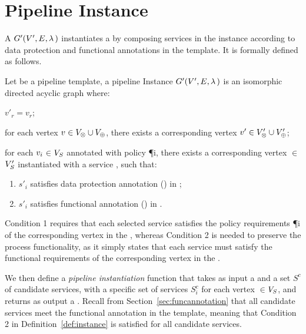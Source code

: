 \section{Pipeline Instance}\label{sec:instance}
A \pipelineInstance $G'(V',E,\lambda\,)$ instantiates a \pipelineTemplate \tChartFunction by composing services in the instance according to data protection and functional annotations in the template.  It is formally defined as follows.

    \begin{definition}\label{def:instance}
      Let \tChartFunction be a pipeline template, a pipeline Instance $G'(V',E,\lambda\,)$ is an isomorphic directed acyclic graph where:
      \begin{enumerate*}[label=\textit{\roman*})]
        \item $v'_r$$=$$v_r$;
        \item for each vertex $v_{}\in V_{\otimes}\cup V_{\oplus}$, there exists a corresponding vertex $v'_{}\in V'_{\otimes}\cup V'_{\oplus}$;
        \item for each $v_{i}$$\in$$V_S$ annotated with policy \P{i}, there exists a corresponding vertex $\in$$V'_S$ instantiated with a service , such that:
      \end{enumerate*}
      \begin{enumerate}[label=\arabic*)]
        \item $s'_i$ satisfies data protection annotation \myLambda() in \tChartFunction;
        \item $s'_i$ satisfies functional annotation \myGamma() in \tChartFunction.
      \end{enumerate}
    \end{definition}

Condition 1 requires that each selected service  satisfies the policy requirements \P{i} of the corresponding vertex  in the \pipelineTemplate, whereas Condition 2 is needed to preserve the process functionality, as it simply states that each service  must satisfy the functional requirements  of the corresponding vertex  in the \pipelineTemplate. 

We then define a \emph{pipeline instantiation} function that takes as input a \pipelineTemplate \tChartFunction and a set $S^c$ of candidate services, with a specific set of services $S^c_{i}$ for each vertex $\in$$V_S$, and returns as output a \pipelineInstance \iChartFunction. Recall from Section~\ref{sec:funcannotation} that all candidate services meet the functional annotation in the template, meaning that Condition 2 in Definition~\ref{def:instance} is satisfied for all candidate services.

